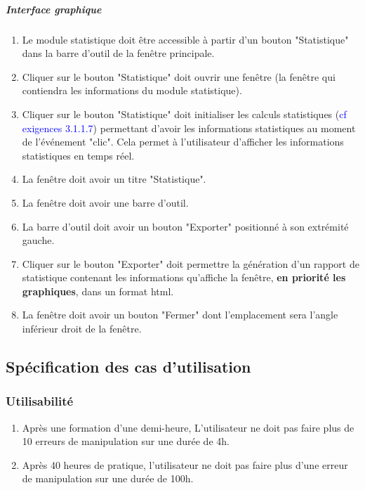 \documentclass[10pt,a4paper]{report}
\begin{document}
	\subparagraph{Interface graphique}
	
		\begin{enumerate}

			\item Le module statistique doit être accessible à partir d'un bouton "Statistique" dans la barre d'outil de la fenêtre principale.

			\item Cliquer sur le bouton "Statistique" doit ouvrir une fenêtre (la fenêtre qui contiendra les informations du module statistique).

			\item Cliquer sur le bouton "Statistique" doit initialiser les calculs statistiques (\textcolor{blue}{cf exigences 3.1.1.7}) permettant d'avoir les informations statistiques au moment de l'événement "clic". Cela permet à l'utilisateur d'afficher les informations statistiques en temps réel.

			\item La fenêtre doit avoir un titre "Statistique".

			\item La fenêtre doit avoir une barre d'outil.
	
			\item La barre d'outil doit avoir un bouton "Exporter" positionné à son extrémité gauche.

			\item Cliquer sur le bouton "Exporter" doit permettre la génération d'un rapport de statistique contenant les informations qu'affiche la fenêtre, \textbf{en priorité les graphiques}, dans un format html.

			\item La fenêtre doit avoir un bouton "Fermer" dont l'emplacement sera l'angle inférieur droit de la fenêtre. 

		\end{enumerate}
	

\subsection{Spécification des cas d’utilisation}


\subsubsection{Utilisabilité}
	\begin{enumerate}
		\item Après une formation d'une demi-heure, L'utilisateur ne doit pas faire plus de 10 erreurs de manipulation sur une durée de 4h.
		\item Après 40 heures de pratique, l'utilisateur ne doit pas faire plus d'une erreur de manipulation sur une durée de 100h.
	\end{enumerate}
\end{document}
